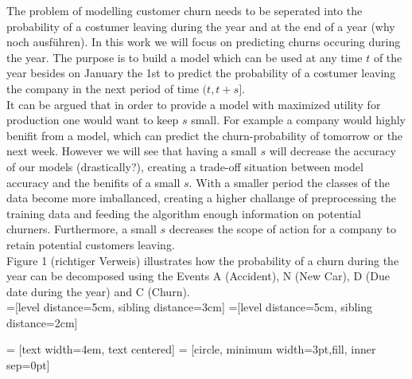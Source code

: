 \documentclass[12pt,titlepage]{article}
\begin{document}
The problem of modelling customer churn needs to be seperated into the probability of a costumer leaving during the
year and at the end of a year (why noch ausführen). In this work we will focus on predicting churns occuring during the year.
The purpose is to build a model which can be used at any time $t$ of the year besides on January the 1st to predict the probability of
a costumer leaving the company in the next period of time $(t, t+s]$. \\
It can be argued that in order to provide a model with maximized utility for production one would want to keep $s$ small. For example
a company would highly benifit from a model, which can predict the churn-probability of tomorrow or the next week. However we will see that
having a small $s$ will decrease the accuracy of our models (drastically?), creating a trade-off situation between model accuracy and the benifits
of a small $s$. With a smaller period the classes of the data become more imballanced, creating a higher challange of preprocessing the training
data and feeding the algorithm enough information on potential churners. Furthermore, a small $s$ decreases the scope of action for a company to
retain potential customers leaving. \\

Figure 1 (richtiger Verweis) illustrates how the probability of a churn during the year can be decomposed using the Events A (Accident), N
(New Car), D (Due date during the year) and C (Churn). \\

=[level distance=5cm, sibling distance=3cm]
=[level distance=5cm, sibling distance=2cm]

 = [text width=4em, text centered]
 = [circle, minimum width=3pt,fill, inner sep=0pt]
\end{document}
